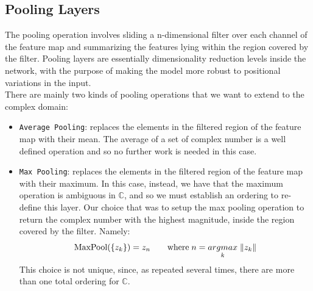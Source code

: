 \documentclass[../main.tex]{subfiles}
\begin{document}
\subsection*{Pooling Layers}
The pooling operation involves sliding a n-dimensional filter over each channel of the feature map and summarizing the features lying within the region covered by the filter. Pooling layers are essentially dimensionality reduction levels inside the network, with the purpose of making the model more robust to positional variations in the input. \\
There are mainly two kinds of pooling operations that we want to extend to the complex domain:
\begin{itemize}
	\item \texttt{Average Pooling}: replaces the elements in the filtered region of the feature map with their mean. The average of a set of complex number is a well defined operation and so no further work is needed in this case.
	\item \texttt{Max Pooling}: replaces the elements in the filtered region of the feature map with their maximum. In this case, instead, we have that the maximum operation is ambiguous in $\mathds{C}$, and so we must establish an ordering to re-define this layer. Our choice that was to setup the max pooling operation to return the complex number with the highest magnitude, inside the region covered by the filter. Namely:
	\[ \text{MaxPool}(\left\{z_k\right\}) = z_n \qquad\text{where}\; n = \underset{k}{argmax}\;\norm{z_k} \] 
	This choice is not unique, since, as repeated several times, there are more than one total ordering for $\mathds{C}$.
\end{itemize}
\end{document}
